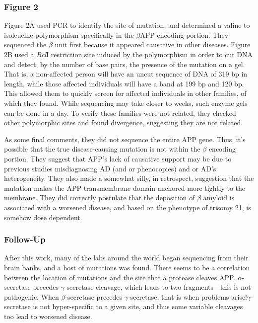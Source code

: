 \documentclass[12pt]{report}
\begin{document}
\subsubsection*{Figure 2} Figure 2A used PCR to identify the site of mutation, and determined a valine to isoleucine polymorphism specifically in the $\beta$APP encoding portion. They sequenced the $\beta$ unit first because it appeared causative in other diseases. Figure 2B used a \textit{Bcl}I restriction site induced by the polymorphism in order to cut DNA and detect, by the number of base pairs, the presence of the mutation on a gel. That is, a non-affected person will have an uncut sequence of DNA of 319 bp in length, while those affected individuals will have a band at 199 bp and 120 bp. This allowed them to quickly screen for affected individuals in other families, of which they found. While sequencing may take closer to weeks, such enzyme gels can be done in a day. To verify these families were not related, they checked other polymorphic sites and found divergence, suggesting they are not related.\newline

As some final comments, they did not sequence the entire APP gene. Thus, it's possible that the true disease-causing mutation is not within the $\beta$ encoding portion. They suggest that APP's lack of causative support may be due to previous studies misdiagnosing AD (and or phenocopies) and or AD's heterogeneity. They also made a somewhat silly, in retrospect, suggestion that the mutation makes the APP transmembrane domain anchored more tightly to the membrane. They did correctly postulate that the deposition of $\beta$ amyloid is associated with a worsened disease, and based on the phenotype of trisomy 21, is somehow dose dependent. 


\subsubsection*{Follow-Up}

After this work, many of the labs around the world began sequencing from their brain banks, and a host of mutations was found. There seems to be a correlation between the location of mutations and the site that a protease cleaves APP. $\alpha$-secretase precedes $\gamma$-secretase cleavage, which leads to two fragments---this is not pathogenic. When $\beta$-secretase precedes $\gamma$-secretase, that is when problems arise!$ \gamma$-secretase is not hyper-specific to a given site, and thus some variable cleavages too lead to worsened disease. 
\end{document}
